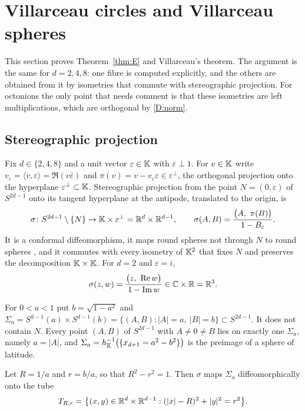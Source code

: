 \section{Villarceau circles and Villarceau spheres}\label{ch:villarceau}

This section proves Theorem~\ref{thm:E} and Villarceau's theorem. The argument is the same for $d=2,4,8$: one fibre is computed explicitly, and the others are obtained from it by isometries that commute with stereographic projection. For octonions the only point that needs comment is that these isometries are left multiplications, which are orthogonal by \ref{D:norm}.

\subsection{Stereographic projection}\label{sec:stereo}

Fix $d\in\{2,4,8\}$ and a unit vector $\varepsilon\in\mathbb{K}$ with $\varepsilon\perp1$. For $v\in\mathbb{K}$ write $v_\varepsilon=\langle v,\varepsilon\rangle=\Re(v\bar\varepsilon)$ and $\pi(v)=v-v_\varepsilon\varepsilon\in\varepsilon^\perp$, the orthogonal projection onto the hyperplane $\varepsilon^\perp\subset\mathbb{K}$. Stereographic projection from the point $N=(0,\varepsilon)$ of $S^{2d-1}$ onto its tangent hyperplane at the antipode, translated to the origin, is
\begin{equation}\label{eq:sigmaN}
\sigma\colon S^{2d-1}\setminus\{N\}\to\mathbb{K}\times\varepsilon^\perp=\mathbb{R}^d\times\mathbb{R}^{d-1},\qquad
\sigma(A,B)=\frac{\bigl(A,\ \pi(B)\bigr)}{1-B_\varepsilon}.
\end{equation}
It is a conformal diffeomorphism, it maps round spheres not through $N$ to round spheres \cite{Lyo03}, and it commutes with every isometry of $\mathbb{K}^2$ that fixes $N$ and preserves the decomposition $\mathbb{K}\times\mathbb{K}$. For $d=2$ and $\varepsilon=i$,
\[
\sigma(z,w)=\frac{\bigl(z,\ \operatorname{Re} w\bigr)}{1-\operatorname{Im} w}\in\mathbb{C}\times\mathbb{R}=\mathbb{R}^3 .
\]

For $0<a<1$ put $b=\sqrt{1-a^2}$ and $\Sigma_a=S^{d-1}(a)\times S^{d-1}(b)=\{(A,B):|A|=a,\ |B|=b\}\subset S^{2d-1}$. It does not contain $N$. Every point $(A,B)$ of $S^{2d-1}$ with $A\neq0\neq B$ lies on exactly one $\Sigma_a$, namely $a=|A|$, and $\Sigma_a=h_{\mathbb{K}}^{-1}\bigl(\{x_{d+1}=a^2-b^2\}\bigr)$ is the preimage of a sphere of latitude.

\begin{lemma}\label{lem:tube}
Let $R=1/a$ and $r=b/a$, so that $R^2-r^2=1$. Then $\sigma$ maps $\Sigma_a$ diffeomorphically onto the tube
\[
T_{R,r}=\bigl\{(x,y)\in\mathbb{R}^d\times\mathbb{R}^{d-1}:(|x|-R)^2+|y|^2=r^2\bigr\}.
\]
\end{lemma}

